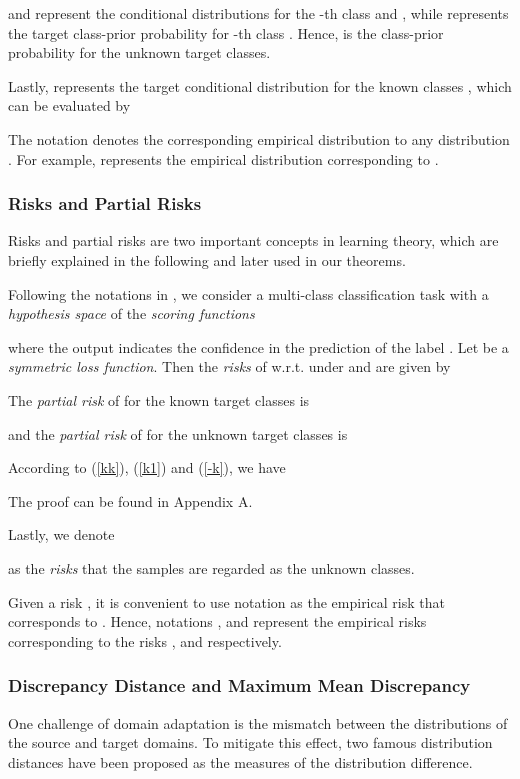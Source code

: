 \documentclass[journal]{IEEEtran}
\begin{document}
 and  represent the conditional distributions for the -th class  and , while  represents the {target class-prior probability} for -th class . Hence,  is the {class-prior probability for the unknown target classes}. 


Lastly,  represents the target conditional distribution for the known classes , which can be evaluated by

The notation  denotes the corresponding empirical distribution to any distribution . For example,  represents the empirical distribution corresponding to .

\subsubsection{{Risks and Partial Risks}} Risks and partial risks are two important concepts in learning theory, which are briefly explained in the following and later used in our theorems. 

Following the notations in \cite{DBLP:conf/icml/0002LLJ19}, we consider a
multi-class classification task with a {\textit{hypothesis space}}  of the {\textit{scoring functions}}

where the output  indicates the confidence in the prediction of the label . Let  be a {\textit{symmetric loss function}}.
Then the {\textit{risks}} of  w.r.t.  under  and   are given by 



The {\textit{partial risk}} of  for the known target classes is

and the {\textit{partial risk}} of   for the unknown target classes is



According to (\ref{kk}), (\ref{k1}) and (\ref{-k}), we have

 The proof can be found in Appendix A.



Lastly, we denote  

as the {\textit{risks}} that the samples are regarded as the unknown classes. 

Given a risk , it is convenient to use notation  as the empirical risk that corresponds to . Hence, notations ,  and  represent the empirical risks corresponding to the risks ,  and  respectively.
\subsubsection{{Discrepancy Distance and Maximum Mean Discrepancy}}
One challenge of domain adaptation is the mismatch between the distributions of the source and target domains. To mitigate this effect, two famous distribution distances have been proposed as the measures of the distribution difference. 
\end{document}
